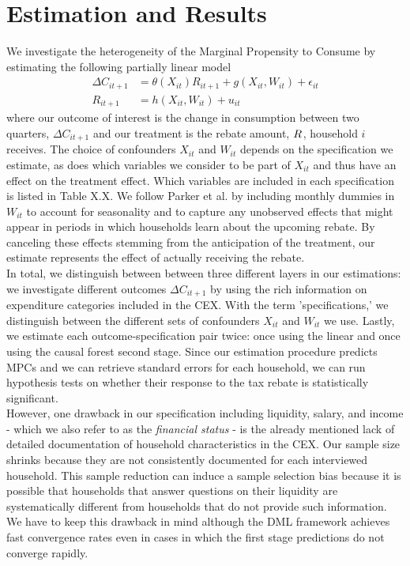 \section{Estimation and Results} \label{sec:estim_res}
We investigate the heterogeneity of the Marginal Propensity to Consume by estimating the following partially linear model
\begin{align}
    \Delta C_{it+1}&=\theta(X_{it})R_{it+1}+g(X_{it}, W_{it})+\epsilon_{it} \label{eq:plm_C1}\\
    R_{it+1}&=h(X_{it}, W_{it})+u_{it} \label{eq:plm_C2}
\end{align}
where our outcome of interest is the change in consumption between two quarters, $\Delta C_{it+1}$ and our treatment is the rebate amount, $R_{
\it}$, household $i$ receives. The choice of confounders $X_{it}$ and $W_{it}$ depends on the specification we estimate, as does which variables we consider to be part of $X_{it}$ and thus have an effect on the treatment effect. Which variables are included in each specification is listed in Table X.X. We follow Parker et al. by including monthly dummies in $W_{it}$ to account for seasonality and to capture any unobserved effects that might appear in periods in which households learn about the upcoming rebate. By canceling these effects stemming from the anticipation of the treatment, our estimate represents the effect of actually receiving the rebate. \\ 
In total, we distinguish between between three different layers in our estimations: we investigate different outcomes $\Delta C_{it+1}$ by using the rich information on expenditure categories included in the CEX. With the term 'specifications,' we distinguish between the different sets of confounders $X_{it}$ and $W_{it}$ we use. Lastly, we estimate each outcome-specification pair twice: once using the linear and once using the causal forest second stage. Since our estimation procedure predicts MPCs and we can retrieve standard errors for each household, we can run hypothesis tests on whether their response to the tax rebate is statistically significant. \\
However, one drawback in our specification including liquidity, salary, and income - which we also refer to as the \textit{financial status} - is the already mentioned lack of detailed documentation of household characteristics in the CEX. Our sample size shrinks because they are not consistently documented for each interviewed household. This sample reduction can induce a sample selection bias because it is possible that households that answer questions on their liquidity are systematically different from households that do not provide such information. We have to keep this drawback in mind although the DML framework achieves fast convergence rates even in cases in which the first stage predictions do not converge rapidly.

